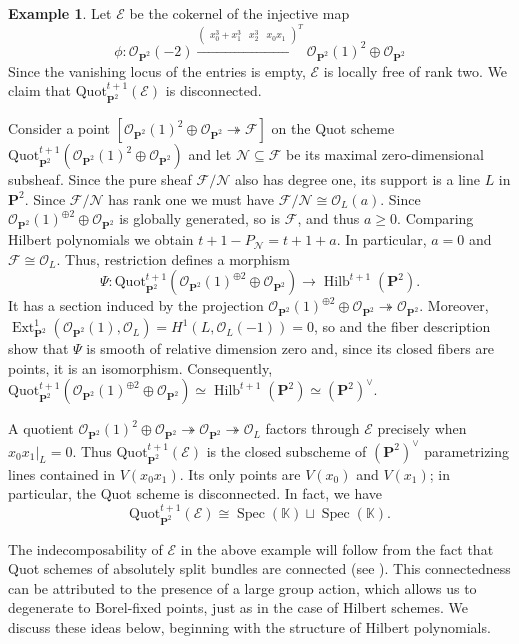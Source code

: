 \documentclass[leqno,11pt,a4paper]{amsart}
\theoremstyle{definition}
\newtheorem{example}[example]{Example}
\numberwithin{equation}{section}
\newcommand{\kk}{\mathbb{K}}
\newcommand{\Quot}{\mathrm{Quot}}
\newcommand{\PP}{\mathbf{P}}
\newcommand{\EE}{\mathscr{E}}
\newcommand{\FF}{\mathscr{F}}
\newcommand{\OO}{\mathscr{O}}
\newcommand{\NN}{\mathscr{N}}
\DeclareMathOperator{\Ext}{Ext}
\DeclareMathOperator{\Hilb}{Hilb}
\DeclareMathOperator{\Spec}{Spec}
\begin{document}
\begin{example} \label{disconnected_ex} Let $\EE$ be the cokernel of the injective map 
$$
\phi: \OO_{\PP^2}(-2) \xrightarrow{\begin{pmatrix} x_0^3+x_1^3 & x_2^3 & x_0x_1\end{pmatrix}^T} \OO_{\PP^2}(1)^2 \oplus\OO_{\PP^2}
$$
Since the vanishing locus of the entries is empty, $\EE$ is locally free of rank two.  We claim that $\Quot_{\PP^2}^{t+1}(\EE)$ is disconnected.


Consider a point $[\OO_{\PP^2}(1)^2 \oplus \OO_{\PP^2} \twoheadrightarrow \FF]$ on the Quot scheme $\Quot_{\PP^2}^{t+1}(\OO_{\PP^2}(1)^2 \oplus \OO_{\PP^2})$ and let  $\NN \subseteq \FF$ be its maximal zero-dimensional subsheaf. 
Since the pure sheaf $\FF/\NN$ also has degree one, its support is a line $L$ in $\PP^2$. 
Since $\FF/\NN$ has rank one we must have $\FF/\NN \cong\OO_L(a)$.
Since $\OO_{\PP^2}(1)^{\oplus 2} \oplus \OO_{\PP^2}$ is globally generated, so is $\FF$, and thus $a \geq 0$. 
Comparing Hilbert polynomials we obtain $t+1 - P_{\NN} = t+1+ a$. 
In particular, $a = 0$ and $\FF \cong \OO_L$.
Thus, restriction defines a morphism
$$
\Psi:\Quot_{\PP^2}^{t+1}(\OO_{\PP^2}(1)^{\oplus2}\oplus\OO_{\PP^2}) \longrightarrow \Hilb^{t+1}(\PP^2).
$$
It has a section induced by the projection $\OO_{\PP^2}(1)^{\oplus2}\oplus\OO_{\PP^2}\twoheadrightarrow\OO_{\PP^2}$.
Moreover, $\Ext^1_{\PP^2}(\OO_{\PP^2}(1),\OO_L)=H^1(L,\OO_L(-1))=0$, so   and the fiber description show that $\Psi$ is smooth of relative dimension zero and, since its closed fibers are points, it is an isomorphism.
Consequently, $\Quot_{\PP^2}^{t+1}(\OO_{\PP^2}(1)^{\oplus2}\oplus\OO_{\PP^2}) \simeq\Hilb^{t+1}(\PP^2)\simeq(\PP^2)^\vee.$



A quotient $\OO_{\PP^2}(1)^2 \oplus \OO_{\PP^2} \twoheadrightarrow \OO_{\PP^2} \twoheadrightarrow \OO_L$ factors through $\EE$ precisely when $x_0x_1|_L=0$.
Thus $\Quot_{\PP^2}^{t+1}(\EE)$ is the closed subscheme of $(\PP^2)^\vee$ parametrizing lines contained in $V(x_0x_1)$.
Its only points are $V(x_0)$ and $V(x_1)$; in particular, the Quot scheme is disconnected.
In fact, we have  $$\Quot_{\PP^2}^{t+1}(\EE)\cong \Spec(\kk) \sqcup\Spec(\kk).$$
\end{example}

The indecomposability of $\EE$ in the above example will follow from the fact that Quot schemes of absolutely split bundles are connected (see ). 
This connectedness can be attributed to the presence of a large group action, which allows us to degenerate to Borel-fixed points, just as in the case of Hilbert schemes. 
We discuss these ideas below, beginning with the structure of Hilbert polynomials.
\end{document}
